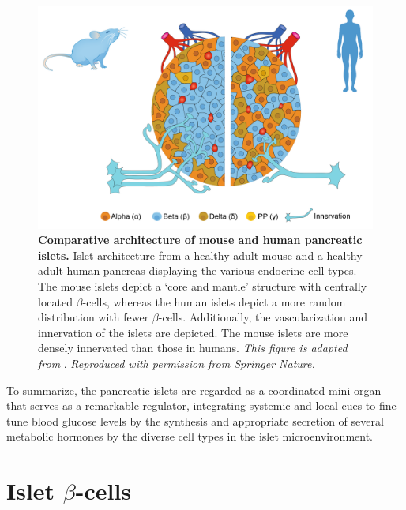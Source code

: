 \begin{figure}[H]
    \centering
    \includegraphics[width=12cm]{Chapter1/Fig/F1-2-1-01.png}
    \caption[Comparative architecture of mouse and human pancreatic islets]{\textbf{Comparative architecture of mouse and human pancreatic islets.} Islet architecture from a healthy adult mouse and a healthy adult human pancreas displaying the various endocrine cell-types. The mouse islets depict a `core and mantle' structure with centrally located $\beta$-cells, whereas the human islets depict a more random distribution with fewer $\beta$-cells. Additionally, the vascularization and innervation of the islets are depicted. The mouse islets are more densely innervated than those in humans. \textit{This figure is adapted from }\textbf{\cite{jain_targeting_2022,noguchi_integrating_2019}}. \textit{ Reproduced with permission from Springer Nature.}}
    \label{fig:chp1_mouse_human_islets}
\end{figure}

\par To summarize, the pancreatic islets are regarded as a coordinated mini-organ that serves as a remarkable regulator, integrating systemic and local cues to fine-tune blood glucose levels by the synthesis and appropriate secretion of several metabolic hormones by the diverse cell types in the islet microenvironment.


\clearpage



\section{ Islet $\beta$-cells}  %
\label{sec:islet-betacells}  

